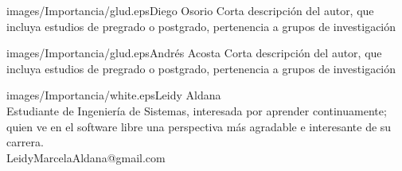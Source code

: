 \begin{multicols}{2}



\medskip



\begin{biografia}{images/Importancia/glud.eps}{Diego Osorio} 
Corta descripción del autor, que incluya estudios de pregrado o postgrado, pertenencia a grupos de investigación
\end{biografia}

\begin{biografia}{images/Importancia/glud.eps}{Andrés Acosta} 
Corta descripción del autor, que incluya estudios de pregrado o postgrado, pertenencia a grupos de investigación
\end{biografia}

\begin{biografia}{images/Importancia/white.eps}{Leidy Aldana} 
\\Estudiante de Ingeniería de Sistemas, interesada por aprender continuamente; quien ve en el software libre una perspectiva más agradable e interesante de su carrera.\\LeidyMarcelaAldana@gmail.com

\end{biografia}

\raggedcolumns
\pagebreak


\end{multicols}

\clearpage
\pagebreak
